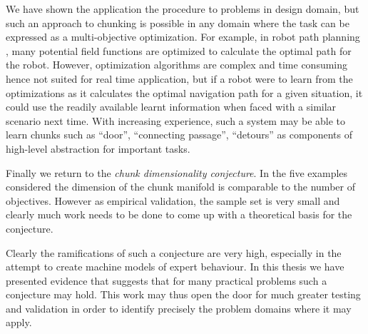 We have shown the application the procedure to problems in design domain,
but such an approach to chunking is possible in any domain where the task
can be expressed as a multi-objective optimization. For example, in robot
path planning \citep{vadakkepat02}, many potential field functions are
optimized to calculate the optimal path for the robot. However,
optimization algorithms are complex and time consuming hence not suited for
real time application, but if a robot were to learn from the optimizations
as it calculates the optimal navigation path for a given situation, it
could use the readily available learnt information when faced with a
similar scenario next time. With increasing experience, such a system may
be able to learn chunks such as ``door'', ``connecting passage'',
``detours'' as components of high-level abstraction for important tasks.

Finally we return to the {\em chunk dimensionality conjecture}. In the five
examples considered the dimension of the chunk manifold is comparable to
the number of objectives. However as empirical validation, the sample set
is very small and clearly much work needs to be done to come up with a
theoretical basis for the conjecture.

Clearly the ramifications of such a conjecture are very high, especially in
the attempt to create machine models of expert behaviour. In this thesis we
have presented evidence that suggests that for many practical problems such
a conjecture may hold. This work may thus open the door for much greater
testing and validation in order to identify precisely the problem domains
where it may apply.


